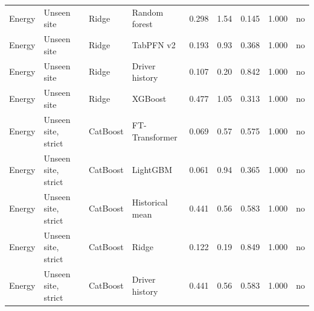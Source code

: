 {\begin{longtable}{llllrrrrl}
Energy & Unseen site & Ridge & Random forest & 0.298 & 1.54 & 0.145 & 1.000 & no \\
Energy & Unseen site & Ridge & TabPFN v2 & 0.193 & 0.93 & 0.368 & 1.000 & no \\
Energy & Unseen site & Ridge & Driver history & 0.107 & 0.20 & 0.842 & 1.000 & no \\
Energy & Unseen site & Ridge & XGBoost & 0.477 & 1.05 & 0.313 & 1.000 & no \\
Energy & Unseen site, strict & CatBoost & FT-Transformer & 0.069 & 0.57 & 0.575 & 1.000 & no \\
Energy & Unseen site, strict & CatBoost & LightGBM & 0.061 & 0.94 & 0.365 & 1.000 & no \\
Energy & Unseen site, strict & CatBoost & Historical mean & 0.441 & 0.56 & 0.583 & 1.000 & no \\
Energy & Unseen site, strict & CatBoost & Ridge & 0.122 & 0.19 & 0.849 & 1.000 & no \\
Energy & Unseen site, strict & CatBoost & Driver history & 0.441 & 0.56 & 0.583 & 1.000 & no \\
\end{longtable}}

